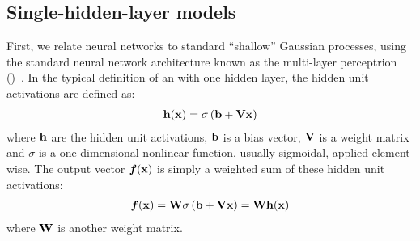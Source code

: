 \subsection{Single-hidden-layer models}

First, we relate neural networks to standard ``shallow'' Gaussian processes, using the standard neural network architecture known as the multi-layer perceptrion (\MLP{})~\citep{rosenblatt1962principles}.
In the typical definition of an \MLP{} with one hidden layer, the hidden unit activations are defined as:
%
\begin{align}
{\bf{h}}({\bf{x}}) = \sigma \left( {\bf{b}} + \mathbf{V} {\bf{x}} \right)
\end{align}
%
where ${\bf{h}}$ are the hidden unit activations, ${\bf{b}}$ is a bias vector, $\mathbf{V}$ is a weight matrix and $\sigma$ is a one-dimensional nonlinear function, usually sigmoidal, applied element-wise. The output vector $\boldsymbol{f}({\bf{x}})$ is simply a weighted sum of these hidden unit activations:
%
\begin{align}
\boldsymbol{f}({\bf{x}}) = \mathbf{W} \sigma \left( {\bf{b}} + \mathbf{V} {\bf{x}} \right)  = \mathbf{W} {\bf{h}}({\bf{x}})
\label{eq:one-layer-nn}
\end{align}
%
where $\mathbf{W}$ is another weight matrix.

